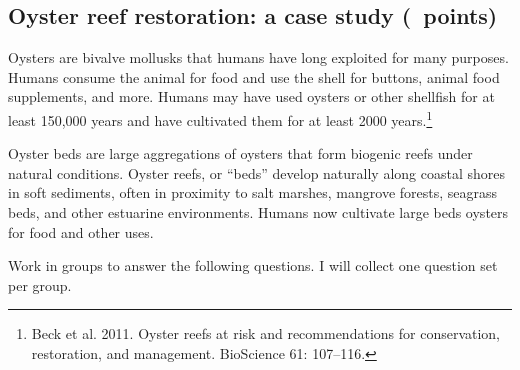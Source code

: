 \documentclass[12pt, addpoints, hidelinks]{exam}
\begin{document}
\subsection*{Oyster reef restoration: a case study (\numpoints\ points)}

Oysters are bivalve mollusks that humans have long exploited for many purposes. Humans consume the animal for food and use the shell for buttons, animal food supplements, and more. Humans may have used oysters or other shellfish for at least 150,000 years and have cultivated them for at least 2000 years.\footnote{Beck et al. 2011. Oyster reefs at risk and recommendations for conservation, restoration, and management. BioScience 61: 107--116.}

Oyster beds are large aggregations of oysters that form biogenic reefs under natural conditions. Oyster reefs, or “beds” develop naturally along coastal shores in soft sediments, often in proximity to salt marshes, mangrove forests, seagrass beds, and other estuarine environments. Humans now cultivate large beds oysters for food and other uses. 

Work in groups to answer the following questions. I will collect one question set per group.
\end{document}
